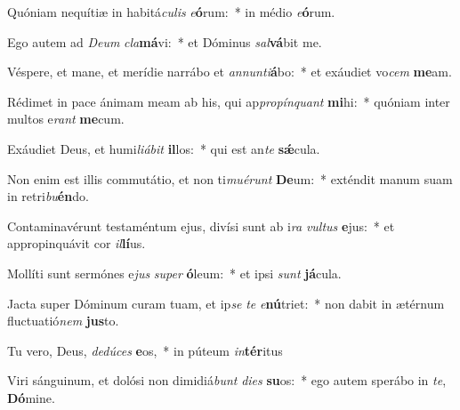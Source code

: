 \item Quóniam nequítiæ in habitá\textit{cu}\textit{lis} \textit{e}\textbf{ó}rum:~* in médio \textit{e}\textbf{ó}rum.
\item Ego autem ad \textit{De}\textit{um} \textit{cla}\textbf{má}vi:~* et Dóminus \textit{sal}\textbf{vá}bit me.
\item Véspere, et mane, et merídie narrábo et \textit{an}\textit{nun}\textit{ti}\textbf{á}bo:~* et exáudiet vo\textit{cem} \textbf{me}am.
\item Rédimet in pace ánimam meam ab his, qui ap\textit{pro}\textit{pín}\textit{quant} \textbf{mi}hi:~* quóniam inter multos e\textit{rant} \textbf{me}cum.
\item Exáudiet Deus, et humi\textit{li}\textit{á}\textit{bit} \textbf{il}los:~* qui est an\textit{te} \textbf{sǽ}cula.
\item Non enim est illis commutátio, et non ti\textit{mu}\textit{é}\textit{runt} \textbf{De}um:~* exténdit manum suam in retri\textit{bu}\textbf{én}do.
\item Contaminavérunt testaméntum ejus, divísi sunt ab i\textit{ra} \textit{vul}\textit{tus} \textbf{e}jus:~* et appropinquávit cor \textit{il}\textbf{lí}us.
\item Mollíti sunt sermónes e\textit{jus} \textit{su}\textit{per} \textbf{ó}leum:~* et ipsi \textit{sunt} \textbf{já}cula.
\item Jacta super Dóminum curam tuam, et ip\textit{se} \textit{te} \textit{e}\textbf{nú}triet:~* non dabit in ætérnum fluctuatió\textit{nem} \textbf{jus}to.
\item Tu vero, Deus, \textit{de}\textit{dú}\textit{ces} \textbf{e}os,~* in púteum \textit{in}\textbf{tér}itus
\item Viri sánguinum, et dolósi non dimidiá\textit{bunt} \textit{di}\textit{es} \textbf{su}os:~* ego autem sperábo in \textit{te}, \textbf{Dó}mine.
